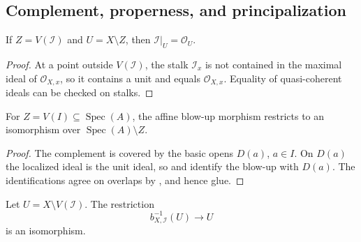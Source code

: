 \subsection{Complement, properness, and principalization}

\begin{lemma}
  \label{lemma:nagata-ideal-unit-off-support}

  If $Z=V(\mathcal I)$ and $U=X\setminus Z$, then
  $\mathcal I|_U=\mathcal O_U$.
\end{lemma}

\begin{proof}
  At a point outside $V(\mathcal I)$, the stalk $\mathcal I_x$ is not
  contained in the maximal ideal of $\mathcal O_{X,x}$, so it contains a unit
  and equals $\mathcal O_{X,x}$.  Equality of quasi-coherent ideals can be
  checked on stalks.
\end{proof}

\begin{lemma}
  \label{lemma:nagata-affine-blowup-complement}

  For $Z=V(I)\subseteq\operatorname{Spec}(A)$, the affine blow-up morphism
  restricts to an isomorphism over $\operatorname{Spec}(A)\setminus Z$.
\end{lemma}

\begin{proof}
  The complement is covered by the basic opens $D(a)$, $a\in I$.  On $D(a)$
  the localized ideal is the unit ideal, so
   and
   identify the blow-up with $D(a)$.
  The identifications agree on overlaps by
  , and hence glue.
\end{proof}

\begin{theorem}
  \label{thm:nagata-global-blowup-complement}

  Let $U=X\setminus V(\mathcal I)$.  The restriction
  \[
    b_{X,\mathcal I}^{-1}(U)\longrightarrow U
  \]
  is an isomorphism.
\end{theorem}

